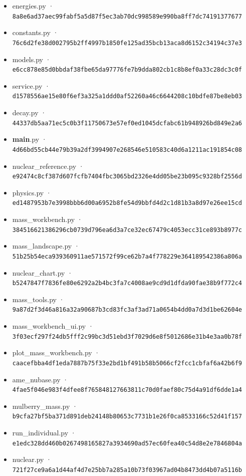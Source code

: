 \documentclass[
  11pt,
  letterpaper,
]{article}
\providecommand{\tightlist}{%
  \setlength{\itemsep}{0pt}\setlength{\parskip}{0pt}}
\begin{document}
\begin{itemize}
\tightlist
\item
  energies.py ·
  \texttt{8a8e6ad37aec99fabf5a5d87f5ec3ab70dc998589e990ba8ff7dc74191377677}
\item
  constants.py ·
  \texttt{76c6d2fe38d002795b2ff4997b1850fe125ad35bcb13aca8d6152c34194c37e3}
\item
  models.py ·
  \texttt{e6cc878e85d0bbdaf38fbe65da97776fe7b9dda802cb1c8b8ef0a33c28dc3c0f}
\item
  service.py ·
  \texttt{d1578556ae15e80f6ef3a325a1ddd0af52260a46c6644208c10bdfe87be8eb03}
\item
  decay.py ·
  \texttt{44337db5aa71ec5c0b3f11750673e57ef0ed1045dcfabc61b948926bd849e2a6}
\item
  \textbf{main}.py ·
  \texttt{4d66bd55cb44e79b39a2df3994907e268546e510583c40d6a1211ac191854c08}
\item
  nuclear\_reference.py ·
  \texttt{e92474c8cf387d607fcfb7404fbc3065bd2326e4dd05be23b095c9328bf2556d}
\item
  physics.py ·
  \texttt{ed1487953b7e3998bbb6d00a6952b8fe54d9bbfd4d2c1d81b3a8d97e26ee15cd}
\item
  mass\_workbench.py ·
  \texttt{384516621386296cb0739d796ea6d3a7ce32ec67479c4053ecc31ce893b8977c}
\item
  mass\_landscape.py ·
  \texttt{51b25b54eca939360911ae571572f99ce62b7a4f778229e364189542386a806a}
\item
  nuclear\_chart.py ·
  \texttt{b5247847f7836fe80e6292a2b4bc3fa7c4008ae9cd9d1dfda90fae38b9f772c4}
\item
  mass\_tools.py ·
  \texttt{9a87d2f3d46a816a32a90687b3cd83fc3af3ad71a0654b4dd0a7d3d1be62604e}
\item
  mass\_workbench\_ui.py ·
  \texttt{3f03ecf297f24db5fff2c99bc3d51ebd3f7029d6e8f5012686e31b4e3aa0b78f}
\item
  plot\_mass\_workbench.py ·
  \texttt{caacefbba4df1eda7887b75f33e2bd1bf491b58b5066cf2fcc1cbfaf6a42b6f9}
\item
  ame\_nubase.py ·
  \texttt{4fae5f046e983f4dfee8f765848127663811c70d0faef80c75d4a91df6dde1a4}
\item
  mulberry\_mass.py ·
  \texttt{b9cfa27bf5ba371d891deb24148b80653c7731b1e26f0ca8533166c52d41f157}
\item
  run\_individual.py ·
  \texttt{e1edc328dd460b0267498165827a3934690ad57ec60fea40c54d8e2e7846804a}
\item
  nuclear.py ·
  \texttt{721f27ce9a6a1d44af4d7e25bb7a285a10b73f03967ad04b8473dd4b07a5116b}

\end{itemize}
\end{document}
